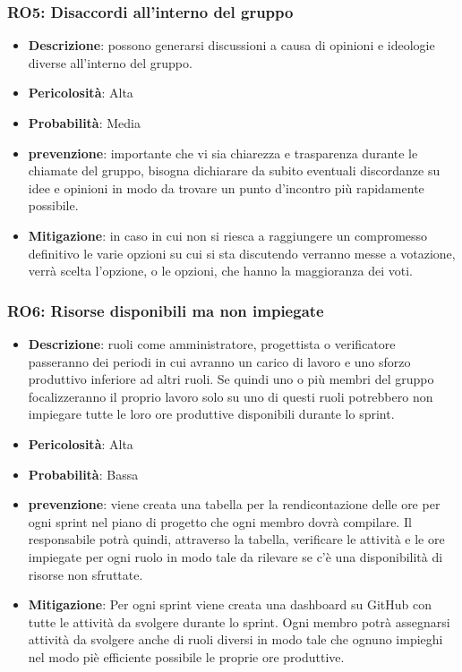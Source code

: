 \documentclass[a4paper, 12pt]{article}
\begin{document}
\subsubsection{RO5: Disaccordi all'interno del gruppo}
\begin{itemize}
    \item \textbf{Descrizione}: possono generarsi discussioni a causa di opinioni e ideologie diverse all'interno del gruppo.
    \item \textbf{Pericolosità}: Alta
    \item \textbf{Probabilità}: Media
    \item \textbf{prevenzione}: importante che vi sia chiarezza e trasparenza durante le chiamate del gruppo, bisogna dichiarare da subito
    eventuali discordanze su idee e opinioni in modo da trovare un punto d'incontro più rapidamente possibile.
    \item \textbf{Mitigazione}: in caso in cui non si riesca a raggiungere un compromesso definitivo le varie opzioni su cui si sta discutendo verranno messe a votazione, verrà scelta l'opzione, o le opzioni, che hanno la maggioranza dei voti. 
\end{itemize}
\subsubsection{RO6: Risorse disponibili ma non impiegate}
\begin{itemize}
    \item \textbf{Descrizione}: ruoli come amministratore, progettista o verificatore passeranno dei periodi in cui avranno un carico 
    di lavoro e uno sforzo produttivo inferiore ad altri ruoli. Se quindi uno o più membri del gruppo focalizzeranno il proprio lavoro solo
    su uno di questi ruoli potrebbero non impiegare tutte le loro ore produttive disponibili durante lo sprint.
    \item \textbf{Pericolosità}: Alta
    \item \textbf{Probabilità}: Bassa
    \item \textbf{prevenzione}: viene creata una tabella per la rendicontazione delle ore per ogni sprint nel piano di progetto che ogni membro dovrà compilare.
    Il responsabile potrà quindi, attraverso la tabella, verificare le attività e le ore impiegate per ogni ruolo in modo tale da rilevare se c'è una disponibilità di risorse non sfruttate.
    \item \textbf{Mitigazione}:  Per ogni sprint viene creata una dashboard su GitHub con tutte le attività da svolgere durante lo sprint.
    Ogni membro potrà assegnarsi attività da svolgere anche di ruoli diversi in modo tale che ognuno impieghi nel modo piè efficiente possibile le proprie ore produttive.
\end{itemize}
\end{document}
